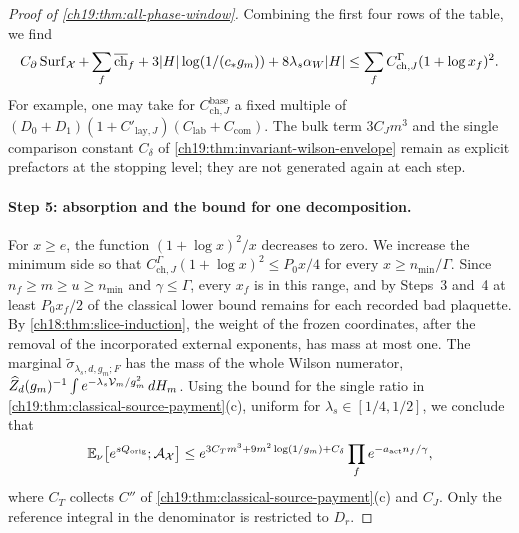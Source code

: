 \begin{proof}[Proof of \cref{ch19:thm:all-phase-window}]
Combining the first four rows of the table, we find
\begin{equation}\label{ch19:eq:charge-budget}
 C_\partial\operatorname{Surf}_{\mathcal X}+\sum_f\overline{\mathrm{ch}}_f+3\lvert H\rvert\log(1/(c_*g_m))+8\lambda_s\alpha_W\lvert H\rvert
 \le\sum_fC_{\mathrm{ch},J}^{\Gamma}(1+\log x_f)^2.
\end{equation}
For example, one may take for $C_{\mathrm{ch},J}^{\mathrm{base}}$ a fixed multiple of $(D_0+D_1)(1+C'_{\mathrm{lay},J})(C_{\mathrm{lab}}+C_{\mathrm{com}})$. The bulk term $3C_Jm^3$ and the single comparison constant $C_\delta$ of \cref{ch19:thm:invariant-wilson-envelope} remain as explicit prefactors at the stopping level; they are not generated again at each step.

\paragraph{Step 5: absorption and the bound for one decomposition.}
For $x\ge e$, the function $(1+\log x)^2/x$ decreases to zero. We increase the minimum side so that $C_{\mathrm{ch},J}^{\Gamma}(1+\log x)^2\le P_0x/4$ for every $x\ge n_{\min}/\Gamma$. Since $n_f\ge m\ge u\ge n_{\min}$ and $\gamma\le\Gamma$, every $x_f$ is in this range, and by Steps~3 and~4 at least $P_0x_f/2$ of the classical lower bound remains for each recorded bad plaquette. By \cref{ch18:thm:slice-induction}, the weight of the frozen coordinates, after the removal of the incorporated external exponents, has mass at most one. The marginal $\widetilde\sigma_{\lambda_s,d,g_m;F}$ has the mass of the whole Wilson numerator, $\widehat Z_d(g_m)^{-1}\int e^{-\lambda_s\mathcal V_m/g_m^2}\,dH_m$. Using the bound for the single ratio in \cref{ch19:thm:classical-source-payment}(c), uniform for $\lambda_s\in[1/4,1/2]$, we conclude that
\begin{equation}\label{ch19:eq:history-moment}
 \mathbb E_\nu\bigl[e^{sQ_{\mathrm{orig}}};\mathcal A_{\mathcal X}\bigr]\le e^{3C_Tm^3+9m^2\log(1/g_m)+C_\delta}\prod_fe^{-a_{\mathrm{act}}n_f/\gamma},
\end{equation}
where $C_T$ collects $C''$ of \cref{ch19:thm:classical-source-payment}(c) and $C_J$. Only the reference integral in the denominator is restricted to $D_r$.


\end{proof}
